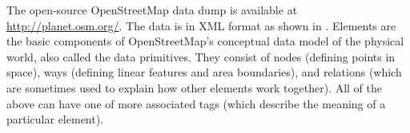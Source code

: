 The open-source OpenStreetMap data dump is available at 
\url{http://planet.osm.org/}. 
%
The data is in XML format as shown in . 
Elements are the basic components of OpenStreetMap's conceptual 
data model of the physical world, also called the data primitives. 
They consist of nodes (defining points in space), 
ways (defining linear features and area boundaries), and 
relations (which are sometimes used to explain how other elements work 
together). All of the above can have one of more associated tags 
(which describe the meaning of a particular element).

